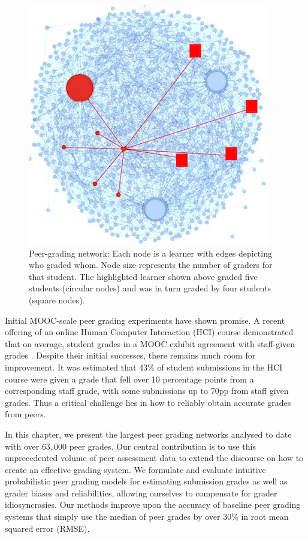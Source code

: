 \begin{figure}
\begin{center}
\includegraphics[width=.6\textwidth]{img/assn5GradingGraph_color}
\end{center}
\caption{Peer-grading network: Each node is a learner with edges depicting
who graded whom. Node size represents the number of graders for that student.
The highlighted learner shown above graded five students (circular nodes)
and was in turn graded by four students (square nodes). }
\label{fig:gradingnetwork}
\end{figure}


Initial MOOC-scale peer grading experiments have shown
promise. A recent offering of an online Human Computer Interaction (HCI) course demonstrated that on average, student grades in a MOOC exhibit agreement with staff-given grades \cite{kulkarni13}. Despite their
initial successes, there remains much room for improvement. It was estimated that 43\% of student submissions in the HCI
course were given a grade that fell over 10 percentage points
from a corresponding staff grade, with some submissions up
to 70pp from staff given grades. Thus a critical challenge lies
in how to reliably obtain accurate grades from peers. 

In this chapter, we present the largest peer grading networks analysed to date with over $63,000$ peer grades. Our central contribution is to use this unprecedented volume of peer assessment data to extend the discourse on how to create an effective grading system. We formulate and evaluate  intuitive probabilistic peer grading models for estimating submission grades as well as grader biases and reliabilities, allowing ourselves to compensate for grader idiosyncrasies. Our methods improve upon the accuracy of baseline peer grading systems that simply use the median of peer grades by over $30\%$ in 
root mean squared error (RMSE).

